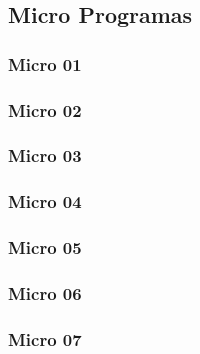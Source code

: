 \documentclass[12pt,a4paper,twoside]{report}
\begin{document}
\subsection{Micro Programas}
\subsubsection{Micro 01}



\subsubsection{Micro 02}



\subsubsection{Micro 03}



\subsubsection{Micro 04}



\subsubsection{Micro 05}



\subsubsection{Micro 06}



\subsubsection{Micro 07}


\end{document}
